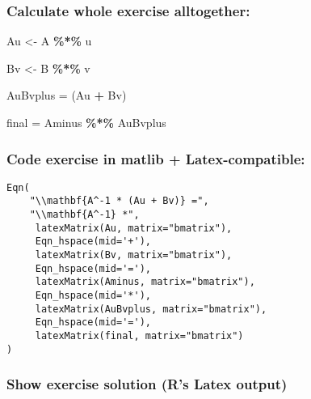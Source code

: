 \documentclass[
  10pt,
  a4paper,
]{article}
\newenvironment{Shaded}{\begin{snugshade}}{\end{snugshade}}
\newcommand{\NormalTok}[1]{#1}
\newcommand{\OtherTok}[1]{\textcolor[rgb]{0.56,0.35,0.01}{#1}}
\newcommand{\SpecialCharTok}[1]{\textcolor[rgb]{0.81,0.36,0.00}{\textbf{#1}}}
\begin{document}
\hypertarget{calculate-whole-exercise-alltogether}{%
\subsubsection{Calculate whole exercise
alltogether:}\label{calculate-whole-exercise-alltogether}}

\begin{Shaded}
\begin{Highlighting}[]
\NormalTok{Au }\OtherTok{\textless{}{-}}\NormalTok{ A }\SpecialCharTok{\%*\%}\NormalTok{ u}

\NormalTok{Bv }\OtherTok{\textless{}{-}}\NormalTok{ B }\SpecialCharTok{\%*\%}\NormalTok{ v}

\NormalTok{AuBvplus }\OtherTok{=}\NormalTok{ (Au }\SpecialCharTok{+}\NormalTok{ Bv)}

\NormalTok{final }\OtherTok{=}\NormalTok{ Aminus }\SpecialCharTok{\%*\%}\NormalTok{ AuBvplus}
\end{Highlighting}
\end{Shaded}

\hypertarget{code-exercise-in-matlib-latex-compatible}{%
\subsubsection{Code exercise in matlib +
Latex-compatible:}\label{code-exercise-in-matlib-latex-compatible}}

\begin{verbatim}
Eqn(
    "\\mathbf{A^-1 * (Au + Bv)} =",
    "\\mathbf{A^-1} *",
     latexMatrix(Au, matrix="bmatrix"),
     Eqn_hspace(mid='+'),
     latexMatrix(Bv, matrix="bmatrix"),
     Eqn_hspace(mid='='),
     latexMatrix(Aminus, matrix="bmatrix"),
     Eqn_hspace(mid='*'),
     latexMatrix(AuBvplus, matrix="bmatrix"),
     Eqn_hspace(mid='='),
     latexMatrix(final, matrix="bmatrix")
)
\end{verbatim}

\hypertarget{show-exercise-solution-rs-latex-output}{%
\subsubsection{Show exercise solution (R's Latex
output)}\label{show-exercise-solution-rs-latex-output}}
\end{document}
